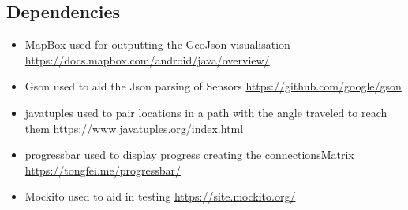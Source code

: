 \documentclass[12pt]{article}
\begin{document}
\subsection{Dependencies}
\begin{itemize}
    \item MapBox used for outputting the GeoJson visualisation \newline \url{https://docs.mapbox.com/android/java/overview/}
    \item Gson used to aid the Json parsing of Sensors \url{https://github.com/google/gson}
    \item javatuples used to pair locations in a path with the angle traveled to reach them \url{https://www.javatuples.org/index.html}
    \item progressbar used to display progress creating the connectionsMatrix \newline \url{https://tongfei.me/progressbar/}
    \item Mockito used to aid in testing \url{https://site.mockito.org/}
\end{itemize}
\end{document}
